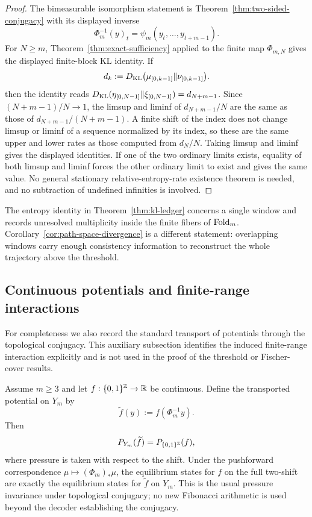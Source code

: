 \begin{proof}
The bimeasurable isomorphism statement is Theorem~\ref{thm:two-sided-conjugacy}
with its displayed inverse
\[
\Phi_m^{-1}(y)_t=\psi_m(y_t,\ldots,y_{t+m-1}).
\]
For $N\ge m$, Theorem~\ref{thm:exact-sufficiency} applied to the finite map
$\Phi_{m,N}$ gives the displayed finite-block KL identity. If
\[
d_k:=D_{\mathrm{KL}}\bigl(\mu_{[0,k-1]}\|\nu_{[0,k-1]}\bigr).
\]
then the identity reads
$D_{\mathrm{KL}}(\eta_{[0,N-1]}\|\xi_{[0,N-1]})=d_{N+m-1}$. Since
$(N+m-1)/N\to1$, the limsup and liminf of $d_{N+m-1}/N$ are the same as those
of $d_{N+m-1}/(N+m-1)$. A finite shift of the index does not change limsup or
liminf of a sequence normalized by its index, so these are the same upper and
lower rates as those computed from $d_N/N$. Taking limsup and liminf gives the
displayed identities. If one of the two ordinary limits exists, equality of
both limsup and liminf forces the other ordinary limit to exist and gives the
same value. No general stationary relative-entropy-rate existence theorem is
needed, and no subtraction of undefined infinities is involved.
\end{proof}

\begin{remark}
The entropy identity in Theorem~\ref{thm:kl-ledger} concerns a single
window and records unresolved multiplicity inside the finite fibers of
$\mathrm{Fold}_m$. Corollary~\ref{cor:path-space-divergence} is a different statement:
overlapping windows carry enough consistency information to reconstruct the
whole trajectory above the threshold.
\end{remark}

\subsection{Continuous potentials and finite-range interactions}\label{sec:measurement:renorm}

For completeness we also record the standard transport of potentials through
the topological conjugacy. This auxiliary subsection identifies the induced
finite-range interaction explicitly and is not used in the proof of the
threshold or Fischer-cover results.

\begin{theorem}\label{thm:continuous-potentials}
Assume $m\ge3$ and let $f:\{0,1\}^{\mathbb{Z}}\to\mathbb{R}$ be continuous.  Define the
transported potential on $Y_m$ by
\[
\widetilde f(y):=f(\Phi_m^{-1}y).
\]
Then
\[
P_{Y_m}(\widetilde f)=P_{\{0,1\}^{\mathbb{Z}}}(f),
\]
where pressure is taken with respect to the shift.  Under the pushforward
correspondence $\mu\mapsto(\Phi_m)_*\mu$, the equilibrium states for $f$ on
the full two-shift are exactly the equilibrium states for $\widetilde f$ on
$Y_m$.
This is the usual pressure invariance under topological conjugacy; no new
Fibonacci arithmetic is used beyond the decoder establishing the conjugacy.
\end{theorem}


